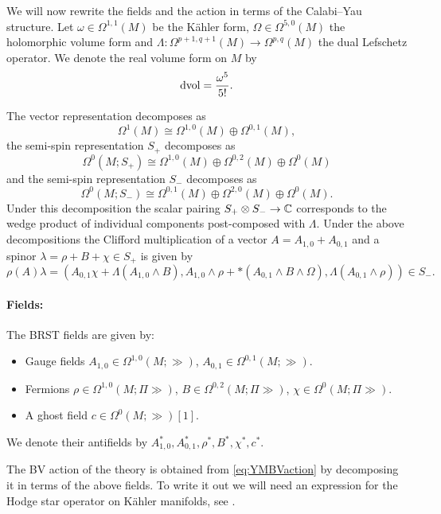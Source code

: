 \documentclass[10pt, oneside]{article}
\begin{document}
We will now rewrite the fields and the action in terms of the Calabi--Yau structure. Let $\omega\in\Omega^{1, 1}(M)$ be the K\"ahler form, $\Omega\in\Omega^{5, 0}(M)$ the holomorphic volume form and $\Lambda\colon \Omega^{p+1, q+1}(M)\rightarrow \Omega^{p, q}(M)$ the dual Lefschetz operator. We denote the real volume form on $M$ by
\[\operatorname{dvol} = \frac{\omega^5}{5!}.\]

The vector representation decomposes as
\[\Omega^1(M)\cong \Omega^{1, 0}(M)\oplus \Omega^{0, 1}(M),\]
the semi-spin representation $S_+$ decomposes as
\[\Omega^0(M; S_+)\cong \Omega^{1, 0}(M)\oplus \Omega^{0, 2}(M)\oplus \Omega^0(M)\]
and the semi-spin representation $S_-$ decomposes as
\[\Omega^0(M; S_-)\cong \Omega^{0, 1}(M)\oplus \Omega^{2, 0}(M)\oplus \Omega^0(M).\]
Under this decomposition the scalar pairing $S_+\otimes S_-\rightarrow \mathbb C$ corresponds to the wedge product of individual components post-composed with $\Lambda$. Under the above decompositions the Clifford multiplication of a vector $A = A_{1, 0} + A_{0, 1}$ and a spinor $\lambda = \rho + B + \chi\in S_+$ is given by
\[\rho(A)\lambda = (A_{0, 1}\chi + \Lambda(A_{1, 0}\wedge B), A_{1, 0}\wedge \rho + \ast(A_{0, 1}\wedge B\wedge\Omega), \Lambda(A_{0, 1}\wedge \rho))\in S_-.\]

\vspace{-10pt}
\paragraph{Fields:} The BRST fields are given by:
\begin{itemize}
\item Gauge fields $A_{1, 0}\in\Omega^{1, 0}(M; \gg)$, $A_{0, 1}\in\Omega^{0, 1}(M; \gg)$.
\item Fermions $\rho\in\Omega^{1, 0}(M; \Pi\gg)$, $B\in\Omega^{0, 2}(M; \Pi\gg)$, $\chi\in\Omega^0(M; \Pi\gg)$.
\item A ghost field $c\in\Omega^0(M; \gg)[1]$.
\end{itemize}
We denote their antifields by $A_{1, 0}^*, A_{0, 1}^*, \rho^*, B^*, \chi^*, c^*$.

The BV action of the theory is obtained from \eqref{eq:YMBVaction} by decomposing it in terms of the above fields. To write it out we will need an expression for the Hodge star operator on K\"{a}hler manifolds, see \cite[Proposition 1.2.31]{Huybrechts}.
\end{document}

